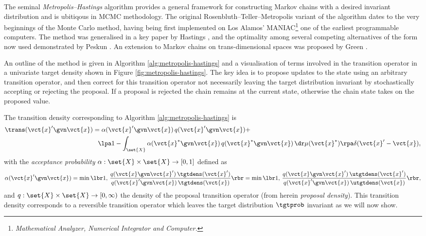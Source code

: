 The seminal \emph{Metropolis--Hastings} algorithm provides a general framework for constructing Markov chains with a desired invariant distribution and is ubitiqous in \ac{MCMC} methodology. The original Rosenbluth--Teller--Metropolis variant of the algorithm \citep{metropolis1953equation} dates to the very beginnings of the Monte Carlo method, having being first implemented on Los Alamos' MANIAC\footnote{\emph{Mathematical Analyzer, Numerical Integrator and Computer.}} one of the earliest programmable computers. The method was generalised in a key paper by Hastings \citep{hastings1970monte}, and the optimality among several competing alternatives of the form now used demonstrated by Peskun \cite{peskun1973optimum}. An extension to Markov chains on trans-dimensional spaces was proposed by Green \citep{green1995reversible}.

An outline of the method is given in Algorithm \ref{alg:metropolis-hastings} and a visualisation of terms involved in the transition operator in a univariate target density shown in Figure \ref{fig:metropolis-hastings}. The key idea is to propose updates to the state using an arbitrary transition operator, and then correct for this transition operator not necessarily leaving the target distribution invariant by stochastically accepting or rejecting the proposal. If a proposal is rejected the chain remains at the current state, otherwise the chain state takes on the proposed value. 

The transition density corresponding to Algorithm \ref{alg:metropolis-hastings} is
\begin{equation}\label{eq:metropolis-hastings-transition-density}
\begin{split}
  \trans(\vct{x}' \gvn \vct{x}) &=
  \alpha(\vct{x}'\gvn \vct{x})\,q(\vct{x}'\gvn \vct{x}) + \, \\
  &\phantom{=}  
  \lpa 1 - 
  \int_{\set{X}} \alpha(\vct{x}^*\gvn \vct{x})\,q(\vct{x}^*\gvn \vct{x}) \,\dr\mu(\vct{x}^*)
  \rpa
  \delta(\vct{x}' - \vct{x}),
\end{split}
\end{equation}
with the \emph{acceptance probability} $\alpha : \set{X} \times \set{X} \to [0,1]$ defined as
\begin{equation}\label{eq:metropolis-hastings-acceptance-probability}
  \alpha(\vct{x}'\gvn \vct{x}) =
  \min\lbr 1,\, \frac{q(\vct{x}\gvn\vct{x}')\,\tgtdens(\vct{x}')}{q(\vct{x}'\gvn\vct{x})\,\tgtdens(\vct{x})} \rbr =
  \min\lbr 1,\, \frac{q(\vct{x}\gvn\vct{x}')\,\utgtdens(\vct{x}')}{q(\vct{x}'\gvn\vct{x})\,\utgtdens(\vct{x})} \rbr,
\end{equation}
and $q : \set{X} \times \set{X} \to [0, \infty)$ the density of the proposal transition operator (from herein \emph{proposal density}). This transition density corresponds to a reversible transition operator which leaves the target distribution $\tgtprob$ invariant as we will now show.

